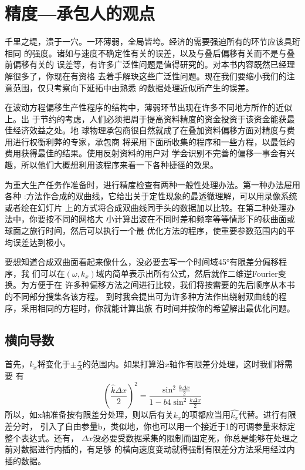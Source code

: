 \section{精度---承包人的观点}
\label{sec:4.7}

千里之堤，溃于一穴。一环薄弱，全局皆垮。经济的需要强迫所有的环节应该具珩相同
的强度。诸如与速度不确定性有关的误差，以及与叠后偏移有关而不是与叠前偏移有关的
误差等，有许多广泛性问题是值得研究的。对本书内容既然已经理解很多了，你现在有资格
去着手解玦这些广泛性问题。现在我们要缩小我们的注意范围，仅只考察向下延拓中由熟悉
的数据处理近似所产生的误差。

在波动方程偏移生产性程序的结构中，薄弱环节出现在许多不同地方所作的近似上。出
于节约的考虑，人们必须把周于提高资料精度的资金投资于该资金能获最佳经济效益之处。地
球物理承包商很自然就成了在叠加资料偏移方面对精度与费用进行权衡利弊的专家，承包商
将采用下面所收集的程序和一些方程，以最低的费用获得最佳的结果。使用反射资料的用户对
学会识别不完善的偏移一事会有兴趣，所以他们大概想利用该程序来看一下各种捷径的效果。

为重大生产任务作准备时，进行精度检查有两种一般性处理办法。第一种办法屉用各种
:方法作合成的双曲线，它给出关于定性现象的最透徹理解，可以用录像系统或者绘在幻灯片
上的方式将合成双曲线同手头的数据加以比较。在第二种处理办法中，你要按不同的网格大
小计算出波在不同时差和频率等等情形下的荻曲面或球面之旅行时间，然后可以执行一个最
优化方法的程序，使重要参数范围内的平均误差达到极小。

要想知道合成双曲面看起来像什么，没必要去写一个时间域45°有限差分偏移程序，我
们可以在$(\omega,k_x)$域内简单表示出所有公式，然后就作二维逆Fourier变换。为方便于在
许多种偏移方法之间进行比较，我们将按需要的先后顺序从本书的不同部分搜集各该方程。
到时我会提出可为许多种方法作出绕射双曲线的程序，采用相同的方程时，你就能计算出旅
冇时间并按你的希望解出最优化问题。

\subsection{横向导数}
\label{sec:4.7.1}

首先，$k_x$将变化于$\pm\frac{\pi}{\Delta}$的范围内。如果打算沿$x$轴作有限差分处理，这时我们将需要
有 
\begin{equation}
(\frac{\hat{k}\Delta x}{2})^2=\frac{\sin^2\frac{k\Delta x}{2}}{1-b4\sin^2\frac{k\Delta x}{2}}
\label{eq:ex4.3.7b}
\end{equation}
所以，如x轴准备按有限差分处理，则以后有关$k_x$的项都应当用$\hat{k_x}$代替。进行有限差分时，
引入了自由参量b，类似地，你也可以用一个接近于1的可调参量来标定整个表达式。还有，
$\Delta x$没必要受数据采集的限制而固定死，你总是能够在处理之前对数据进行内插的，有足够
的横向速度变动就得强制有限差分方法采用经过内插的数据。

